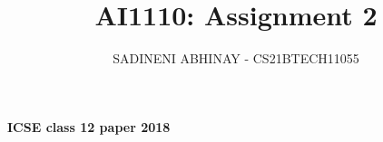 \documentclass[journal,12pt,twocolumn]{IEEEtran}
\DeclareMathOperator*{\Res}{Res}
\begin{document}
	
	\newcommand{\BEQA}{\begin{eqnarray}}
		\newcommand{\EEQA}{\end{eqnarray}}
	\newcommand{\define}{\stackrel{\triangle}{=}}
	
	\raggedbottom
	\setlength{\parindent}{0pt}
	\providecommand{\mbf}{\mathbf}
	\providecommand{\pr}[1]{\ensuremath{\Pr\left(#1\right)}}
	\providecommand{\qfunc}[1]{\ensuremath{Q\left(#1\right)}}
	\providecommand{\sbrak}[1]{\ensuremath{{}\left[#1\right]}}
	\providecommand{\lsbrak}[1]{\ensuremath{{}\left[#1\right.}}
	\providecommand{\rsbrak}[1]{\ensuremath{{}\left.#1\right]}}
	\providecommand{\brak}[1]{\ensuremath{\left(#1\right)}}
	\providecommand{\lbrak}[1]{\ensuremath{\left(#1\right.}}
	\providecommand{\rbrak}[1]{\ensuremath{\left.#1\right)}}
	\providecommand{\cbrak}[1]{\ensuremath{\left\{#1\right\}}}
	\providecommand{\lcbrak}[1]{\ensuremath{\left\{#1\right.}}
	\providecommand{\rcbrak}[1]{\ensuremath{\left.#1\right\}}}
	\theoremstyle{remark}
	\newtheorem{rem}{Remark}
	\newcommand{\sgn}{\mathop{\mathrm{sgn}}}
	\providecommand{\abs}[1]{$\left\vert#1\right\vert$}
	\providecommand{\res}[1]{\Res\displaylimits_{#1}} 
	\providecommand{\norm}[1]{$\left\lVert#1\right\rVert$}
	\providecommand{\mtx}[1]{\mathbf{#1}}
	\providecommand{\mean}[1]{E$\left[ #1 \right]$}
	\providecommand{\fourier}{\overset{\mathcal{F}}{ \rightleftharpoons}}
	\providecommand{\system}{\overset{\mathcal{H}}{ \longleftrightarrow}}
	\newcommand{\solution}{\noindent \textbf{Solution: }}
	\newcommand{\cosec}{\,\text{cosec}\,}
	\providecommand{\dec}[2]{\ensuremath{\overset{#1}{\underset{#2}{\gtrless}}}}
	\newcommand{\myvec}[1]{\ensuremath{\begin{pmatrix}#1\end{pmatrix}}}
	\newcommand{\mydet}[1]{\ensuremath{\begin{vmatrix}#1\end{vmatrix}}}
	\makeatletter
	\makeatother
	\let\StandardTheFigure\thefigure
	\let\vec\mathbf
	\vspace{3cm}
	\title{AI1110: Assignment 2}
	\author{SADINENI ABHINAY - CS21BTECH11055}
	\maketitle
	\newpage
	\bigskip
	\renewcommand{\thefigure}{\theenumi}
	\renewcommand{\thetable}{\theenumi}
	\textbf{ICSE class 12 paper 2018}\\
\end{document}
